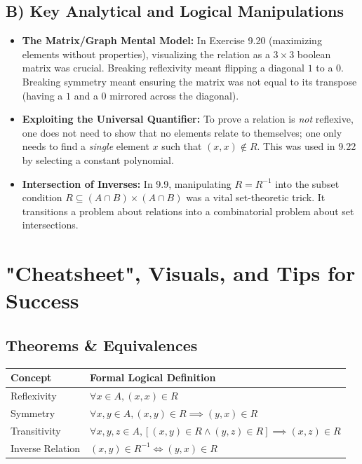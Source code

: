\documentclass[11pt, a4paper]{article}
\theoremstyle{definition}
\theoremstyle{remark}
\begin{document}
\subsection{B) Key Analytical and Logical Manipulations}
\begin{itemize}
    \item \textbf{The Matrix/Graph Mental Model:} In Exercise 9.20 (maximizing elements without properties), visualizing the relation as a $3 \times 3$ boolean matrix was crucial. Breaking reflexivity meant flipping a diagonal $1$ to a $0$. Breaking symmetry meant ensuring the matrix was not equal to its transpose (having a $1$ and a $0$ mirrored across the diagonal).
    \item \textbf{Exploiting the Universal Quantifier:} To prove a relation is \textit{not} reflexive, one does not need to show that no elements relate to themselves; one only needs to find a \textit{single} element $x$ such that $(x,x) \notin R$. This was used in 9.22 by selecting a constant polynomial.
    \item \textbf{Intersection of Inverses:} In 9.9, manipulating $R = R^{-1}$ into the subset condition $R \subseteq (A \cap B) \times (A \cap B)$ was a vital set-theoretic trick. It transitions a problem about relations into a combinatorial problem about set intersections.
\end{itemize}

\newpage

\section{"Cheatsheet", Visuals, and Tips for Success}

\subsection{Theorems \& Equivalences}
\begin{table}[h!]
\centering
\renewcommand{\arraystretch}{1.5}
\begin{tabularx}{\textwidth}{l X}
\toprule
\textbf{Concept} & \textbf{Formal Logical Definition} \\
\midrule
Reflexivity & $\displaystyle \forall x \in A, (x, x) \in R$ \\
Symmetry & $\displaystyle \forall x, y \in A, (x, y) \in R \implies (y, x) \in R$ \\
Transitivity & $\displaystyle \forall x, y, z \in A, [(x, y) \in R \land (y, z) \in R] \implies (x, z) \in R$ \\
Inverse Relation & $\displaystyle (x, y) \in R^{-1} \iff (y, x) \in R$ \\
\bottomrule
\end{tabularx}
\end{table}
\end{document}

